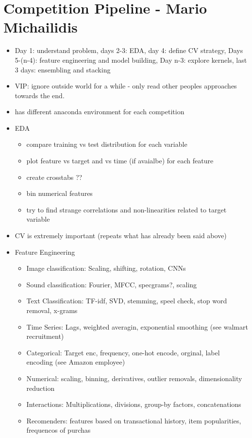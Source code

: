\documentclass[a4paper]{report}
\begin{document}
\section{Competition Pipeline - Mario Michailidis}
\begin{itemize}
  \item Day 1: understand problem, days 2-3: EDA, day 4: define CV strategy, Days 5-(n-4): feature engineering and model building, Day n-3: explore kernels, last 3 days: ensembling and stacking
  \item VIP: ignore outside world for a while - only read other peoples approaches towards the end.
  \item has different anaconda environment for each competition
  \item EDA
    \begin{itemize}
      \item compare training  vs test distribution for each variable
      \item plot feature vs target and vs time (if avaialbe) for each feature
      \item create crosstabs ??
      \item bin numerical features
      \item try to find strange correlations and  non-linearities related to target variable
    \end{itemize}
  \item CV is extremely important (repeats what has already been said above)
  \item Feature Engineering
    \begin{itemize}
      \item Image classification: Scaling, shifting, rotation, CNNs
      \item Sound classification: Fourier, MFCC, specgrams?, scaling
      \item Text Classification: TF-idf, SVD, stemming, speel check, stop word removal, x-grams
      \item Time Series: Lags, weighted averagin, exponential smoothing (see walmart recruitment)
      \item Categorical: Target enc, frequency, one-hot encode, orginal, label encoding (see Amazon employee)
      \item Numerical: scaling, binning, derivatives, outlier removals, dimensionality reduction
      \item Interactions: Multiplications, divisions, group-by factors, concatenations
      \item Recomenders: features based on transactional history, item popularities, frequencos of purchas

\end{itemize}
\end{itemize}
\end{document}
